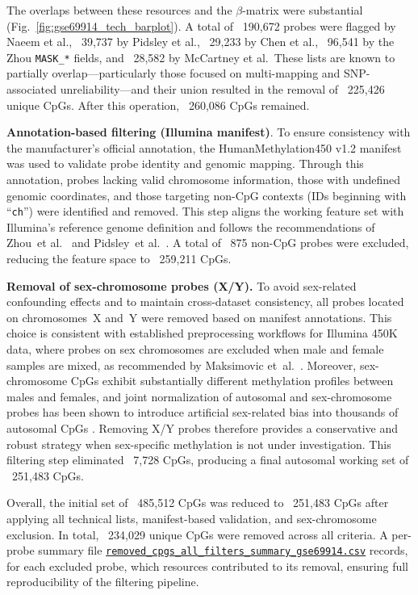 \documentclass[10pt]{extarticle}
\newcommand{\good}[1]{\textcolor{teal!70!black}{\ding{51}~#1}}
\begin{document}
The overlaps between these resources and the $\beta$-matrix were substantial  
(Fig.~\ref{fig:gse69914_tech_barplot}).  
A total of \good{190{,}672 probes} were flagged by Naeem et al., \good{39{,}737} by Pidsley et al.,
\good{29{,}233} by Chen et al., \good{96{,}541} by the Zhou \texttt{MASK\_*} fields, and
\good{28{,}582} by McCartney et al.\  
These lists are known to partially overlap—particularly those focused on multi-mapping and SNP-associated
unreliability—and their union resulted in the removal of \good{225{,}426 unique CpGs}.  
After this operation, \good{260{,}086 CpGs} remained.

\textbf{Annotation-based filtering (Illumina manifest)}.
To ensure consistency with the manufacturer’s official annotation, the HumanMethylation450 v1.2 manifest \cite{Illumina450kManifest} was used to
validate probe identity and genomic mapping.  
Through this annotation, probes lacking valid chromosome information, those with undefined genomic coordinates, and
those targeting non-CpG contexts (IDs beginning with ``\texttt{ch}'') were identified and removed.  
This step aligns the working feature set with Illumina's reference genome definition and follows the recommendations
of Zhou~et al.~\cite{zhou2016} and Pidsley~et al.~\cite{pidsley2016}.  
A total of \good{875 non-CpG probes} were excluded, reducing the feature space to \good{259{,}211 CpGs}.

\textbf{Removal of sex-chromosome probes (X/Y).}
To avoid sex-related confounding effects and to maintain cross-dataset consistency, all probes located on chromosomes~X 
and~Y were removed based on manifest annotations. This choice is consistent with established preprocessing workflows 
for Illumina 450K data, where probes on sex chromosomes are excluded when male and female samples are mixed, as 
recommended by Maksimovic et~al.\ \cite{Maksimovic2012}. Moreover, sex-chromosome CpGs exhibit substantially different 
methylation profiles between males and females, and joint normalization of autosomal and sex-chromosome probes has been 
shown to introduce artificial sex-related bias into thousands of autosomal CpGs \cite{Wang2022InterpolatedXY}. Removing 
X/Y probes therefore provides a conservative and robust strategy when sex-specific methylation is not under investigation. 
This filtering step eliminated \good{7{,}728 CpGs}, producing a final autosomal working set of \good{251{,}483 CpGs}.

Overall, the initial set of \good{485{,}512 CpGs} was reduced to \good{251{,}483 CpGs} after applying all
technical lists, manifest-based validation, and sex-chromosome exclusion.  
In total, \good{234{,}029 unique CpGs} were removed across all criteria.  
A per-probe summary file \href{https://github.com/elisabettaroviera/THESIS/blob/main/05%20-%20CpG%20list/Removed%20CpGs%20per%20Dataset/removed_cpgs_all_filters_summary_gse69914.csv}
{\texttt{removed\_cpgs\_all\_filters\_summary\_gse69914.csv}} records, for each excluded probe,
which resources contributed to its removal, ensuring full reproducibility of the filtering pipeline.  
\end{document}
